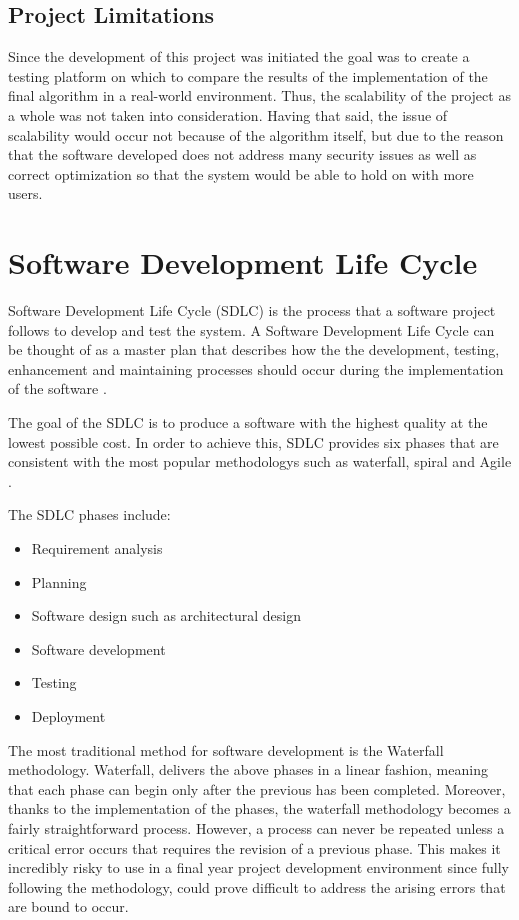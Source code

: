 \subsection {Project Limitations}
Since the development of this project was initiated the goal was to create a testing platform
on which to compare the results of the implementation of the final algorithm in a real-world
environment. Thus, the scalability of the project as a whole was not taken into consideration. Having that said, the issue of scalability would occur not because of the algorithm itself, but
due to the reason that the software developed does not address many security issues as well as
correct optimization so that the system would be able to hold on with more users.


\section{Software Development Life Cycle}
Software Development Life Cycle (SDLC) is the process that a software project follows to develop and test the system. A Software Development Life Cycle can be thought of as a master plan that describes how the the development, testing, enhancement and maintaining processes should occur during the implementation of the software \cite{stackify_2017_what}.

The goal of the SDLC is to produce a software with the highest quality at the lowest possible cost. In order to achieve this, SDLC provides six phases that are consistent with the most popular methodologys such as waterfall, spiral and Agile \cite{stackify_2017_what}.

The SDLC phases include:
\begin{itemize}
  \item Requirement analysis
  \item Planning
  \item Software design such as architectural design
  \item Software development
  \item Testing
  \item Deployment
\end{itemize}

The most traditional method for software development is the Waterfall methodology. Waterfall, delivers the above phases in a linear fashion, meaning that each phase can begin only after the previous has been completed. Moreover, thanks to the implementation of the phases, the waterfall methodology becomes a fairly straightforward process. However, a process can never be repeated unless a critical error occurs that requires the revision of a previous phase. This makes it incredibly risky to use in a final year project development environment since fully following the methodology, could prove difficult to address the arising errors that are bound to occur.

